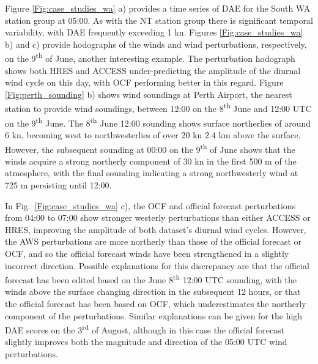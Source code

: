 \documentclass[twocol]{ametsoc}
\begin{document}
Figure \ref{Fig:case_studies_wa} a) provides a time series of DAE for the South WA station group at 05:00. As with the NT station group there is significant temporal variability, with DAE frequently exceeding 1 kn. Figures \ref{Fig:case_studies_wa} b) and c) provide hodographs of the winds and wind perturbations, respectively, on the 9\textsuperscript{th} of June, another interesting example. The perturbation hodograph shows both HRES and ACCESS under-predicting the amplitude of the diurnal wind cycle on this day, with OCF performing better in this regard. Figure \ref{Fig:perth_sounding} b) shows wind soundings at Perth Airport, the nearest station to provide wind soundings, between 12:00 on the 8\textsuperscript{th} June and 12:00 UTC on the 9\textsuperscript{th} June. The 8\textsuperscript{th} June 12:00 sounding shows surface northerlies of around $6$ kn, becoming west to northwesterlies of over 20 kn $2.4$ km above the surface. However, the subsequent sounding at 00:00 on the 9\textsuperscript{th} of June shows that the winds acquire a strong northerly component of 30 kn in the first 500 m of the atmosphere, with the final sounding indicating a strong northwesterly wind at 725 m persisting until 12:00. 

In Fig.~\ref{Fig:case_studies_wa} c), the OCF and official forecast perturbations from 04:00 to 07:00 show stronger westerly perturbations than either ACCESS or HRES, improving the amplitude of both dataset's diurnal wind cycles. However, the AWS perturbations are more northerly than those of the official forecast or OCF, and so the official forecast winds have been strengthened in a slightly incorrect direction. Possible explanations for this discrepancy are that the official forecast has been edited based on the June 8\textsuperscript{th} 12:00 UTC sounding, with the winds above the surface changing direction in the subsequent 12 hours, or that the official forecast has been based on OCF, which underestimates the northerly component of the perturbations. Similar explanations can be given for the high DAE scores on the  3\textsuperscript{rd} of August, although in this case the official forecast slightly improves both the magnitude and direction of the 05:00 UTC wind perturbations.
\end{document}

